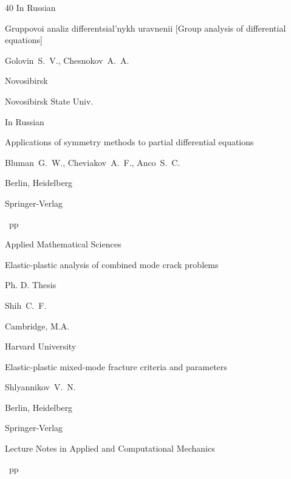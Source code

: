 \begin{thebibliography}{40}
\lang In Russian




\book Gruppovoi analiz differentsial'nykh uravnenii \rm [Group analysis of differential equations]

\by Golovin~S.~V., Chesnokov~A.~A.

\publaddr Novosibirsk

\publ Novosibirsk State Univ.



\lang In Russian




\book Applications of symmetry methods to partial differential equations

\by Bluman~G.~W., Cheviakov~A.~F., Anco~S.~C.

\publaddr Berlin, Heidelberg

\publ Springer-Verlag


~pp \nofrills


\serial Applied Mathematical Sciences





\thesis Elastic-plastic analysis of combined mode crack problems

\thesisinfo Ph. D. Thesis

\by Shih~C.~F.

\publaddr Cambridge, M.A.

\publ Harvard University





\book Elastic-plastic mixed-mode fracture criteria and parameters

\by Shlyannikov~V.~N.

\publaddr Berlin, Heidelberg

\publ Springer-Verlag


\serial Lecture Notes in Applied and Computational Mechanics


~pp \nofrills


\end{thebibliography}

